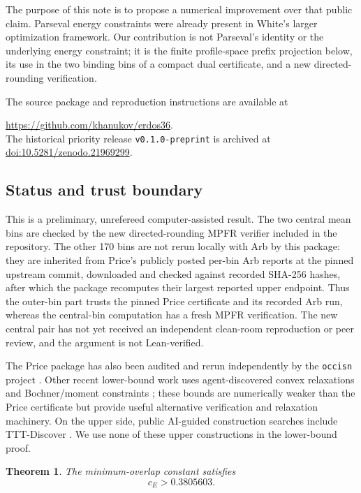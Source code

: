 \documentclass[11pt]{amsart}
\newtheorem{theorem}{Theorem}
\begin{document}
The purpose of this note is to propose a numerical improvement over that
public claim.  Parseval energy constraints were already present in White's
larger optimization framework.  Our contribution is not Parseval's identity
or the underlying energy constraint; it is the finite profile-space prefix
projection below, its use in the two binding bins of a compact dual
certificate, and a new directed-rounding verification.

The source package and reproduction instructions are available at
\begin{center}
\url{https://github.com/khanukov/erdos36}.\\
The historical priority release \texttt{v0.1.0-preprint} is archived at
\href{https://doi.org/10.5281/zenodo.21969299}%
{doi:10.5281/zenodo.21969299}.
\end{center}

\subsection*{Status and trust boundary}
This is a preliminary, unrefereed computer-assisted result.  The two central
mean bins are checked by the new directed-rounding MPFR verifier included in
the repository.  The other 170 bins are not rerun locally with Arb by this
package: they are inherited from Price's publicly posted per-bin Arb reports at the
pinned upstream commit, downloaded and checked against recorded SHA-256
hashes, after which the package recomputes their largest reported upper
endpoint.  Thus the outer-bin part trusts the pinned Price certificate and its
recorded Arb \cite{Johansson2017} run, whereas the central-bin computation has a fresh MPFR
verification.  The new central pair has not yet received an independent
clean-room reproduction or peer review, and the argument is not Lean-verified.


The Price package has also been audited and rerun independently by the
\texttt{occisn} project \cite{Occisn2026}.  Other recent lower-bound work uses
agent-discovered convex relaxations \cite{KimPilanci2026} and Bochner/moment
constraints \cite{Zanghi2026}; these bounds are numerically weaker than the
Price certificate but provide useful alternative verification and relaxation
machinery.  On the upper side, public AI-guided construction searches include
TTT-Discover \cite{Yuksekgonul2026}.  We use none of these upper constructions
in the lower-bound proof.

\begin{theorem}\label{thm:main}
The minimum-overlap constant satisfies
\[
 \boxed{c_E>0.3805603}.
\]
\end{theorem}
\end{document}
